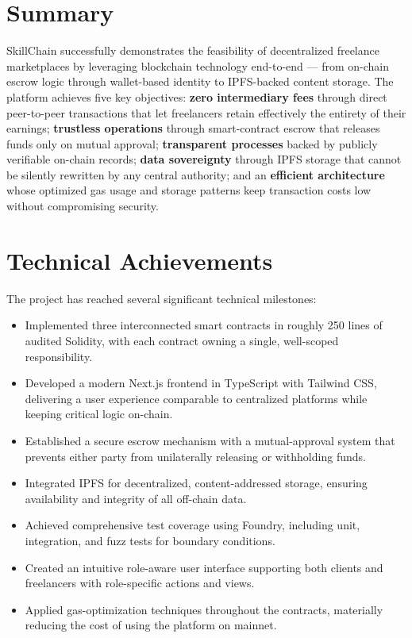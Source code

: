 \section{Summary}

SkillChain successfully demonstrates the feasibility of decentralized freelance marketplaces by leveraging blockchain technology end-to-end --- from on-chain escrow logic through wallet-based identity to IPFS-backed content storage. The platform achieves five key objectives: \textbf{zero intermediary fees} through direct peer-to-peer transactions that let freelancers retain effectively the entirety of their earnings; \textbf{trustless operations} through smart-contract escrow that releases funds only on mutual approval; \textbf{transparent processes} backed by publicly verifiable on-chain records; \textbf{data sovereignty} through IPFS storage that cannot be silently rewritten by any central authority; and an \textbf{efficient architecture} whose optimized gas usage and storage patterns keep transaction costs low without compromising security.

\section{Technical Achievements}

The project has reached several significant technical milestones:

\begin{itemize}
    \item Implemented three interconnected smart contracts in roughly 250 lines of audited Solidity, with each contract owning a single, well-scoped responsibility.
    \item Developed a modern Next.js frontend in TypeScript with Tailwind CSS, delivering a user experience comparable to centralized platforms while keeping critical logic on-chain.
    \item Established a secure escrow mechanism with a mutual-approval system that prevents either party from unilaterally releasing or withholding funds.
    \item Integrated IPFS for decentralized, content-addressed storage, ensuring availability and integrity of all off-chain data.
    \item Achieved comprehensive test coverage using Foundry, including unit, integration, and fuzz tests for boundary conditions.
    \item Created an intuitive role-aware user interface supporting both clients and freelancers with role-specific actions and views.
    \item Applied gas-optimization techniques throughout the contracts, materially reducing the cost of using the platform on mainnet.
\end{itemize}

